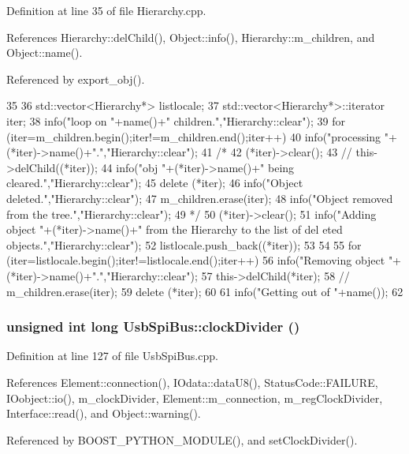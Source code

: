 Definition at line 35 of file Hierarchy.cpp.

References Hierarchy::delChild(), Object::info(), Hierarchy::m\_\-children, and Object::name().

Referenced by export\_\-obj().


\begin{DoxyCode}
35                      {
36   std::vector<Hierarchy*> listlocale;
37   std::vector<Hierarchy*>::iterator iter;
38   info("loop on "+name()+" children.","Hierarchy::clear");
39   for (iter=m_children.begin();iter!=m_children.end();iter++){
40       info("processing "+(*iter)->name()+".","Hierarchy::clear");
41 /*
42       (*iter)->clear();
43 //      this->delChild((*iter));
44       info("obj "+(*iter)->name()+" being cleared.","Hierarchy::clear");
45       delete (*iter);
46       info("Object deleted.","Hierarchy::clear");
47       m_children.erase(iter);
48       info("Object removed from the tree.","Hierarchy::clear");
49 */
50     (*iter)->clear();
51     info("Adding object "+(*iter)->name()+" from the Hierarchy to the list of del
      eted objects.","Hierarchy::clear");
52     listlocale.push_back((*iter));
53   }
54 
55   for (iter=listlocale.begin();iter!=listlocale.end();iter++){
56     info("Removing object "+(*iter)->name()+".","Hierarchy::clear");
57     this->delChild(*iter);
58 //    m_children.erase(iter);
59     delete (*iter);
60   }
61   info("Getting out of "+name());
62 }
\end{DoxyCode}
\hypertarget{classUsbSpiBus_aa7a56b8aedb646ba46408cb5016dde1c}{
\subsubsection[{clockDivider}]{\setlength{\rightskip}{0pt plus 5cm}unsigned int long UsbSpiBus::clockDivider ()}}
\label{classUsbSpiBus_aa7a56b8aedb646ba46408cb5016dde1c}


Definition at line 127 of file UsbSpiBus.cpp.

References Element::connection(), IOdata::dataU8(), StatusCode::FAILURE, IOobject::io(), m\_\-clockDivider, Element::m\_\-connection, m\_\-regClockDivider, Interface::read(), and Object::warning().

Referenced by BOOST\_\-PYTHON\_\-MODULE(), and setClockDivider().


